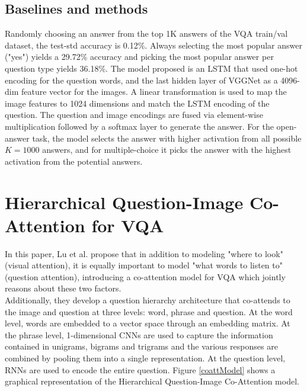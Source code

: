 \documentclass{article}
\begin{document}
\subsection{Baselines and methods}
Randomly choosing an answer from the top 1K answers of the VQA train/val dataset, the test-std accuracy is 0.12\%. Always selecting the most popular answer ("yes") yields a 29.72\% accuracy and picking the most popular answer per question type yields 36.18\%.
The model proposed is an LSTM that used one-hot encoding for the question words, and the last hidden layer of VGGNet as a 4096-dim feature vector for the images. A linear transformation is used to map the image features to 1024 dimensions and match the LSTM encoding of the question. The question and image encodings are fused via element-wise multiplication followed by a softmax layer to generate the answer. For the open-answer task, the model selects the answer with higher activation from all possible $K=1000$ answers, and for multiple-choice it picks the answer with the highest activation from the potential answers.\\

\section{Hierarchical Question-Image Co-Attention for VQA}\label{hiercoattSec}
In this paper, Lu et al. \citep{nipsLu16} propose that in addition to modeling "where to look" (visual attention), it is equally important to model "what words to listen to" (question attention), introducing a co-attention model for VQA which jointly reasons about these two factors.\\
Additionally, they develop a question hierarchy architecture that co-attends to the image and question at three levels: word, phrase and question. At the word level, words are embedded to a vector space through an embedding matrix. At the phrase level, 1-dimensional CNNs are used to capture the information contained in unigrams, bigrams and trigrams and the various responses are combined by pooling them into a single representation. At the question level, RNNs are used to encode the entire question. Figure \ref{coattModel} shows a graphical representation of the Hierarchical Question-Image Co-Attention model.
\end{document}
